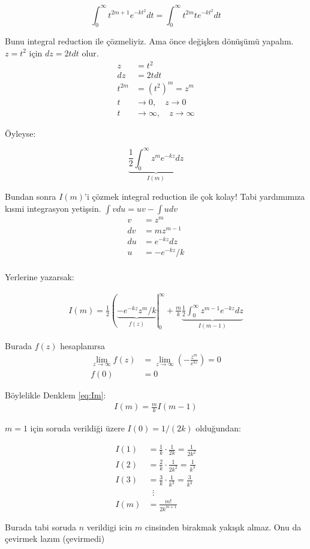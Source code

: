 \documentclass{article}
\begin{document}
\begin{equation}
    \int_0^\infty t^{2m+1}e^{-kt^2}dt = \int_0^\infty t^{2m}te^{-kt^2}dt
\end{equation}

Bunu integral reduction ile çözmeliyiz. Ama önce değişken dönüşümü yapalım. $z = t^2$ için $dz = 2tdt$ olur.
\begin{align}
    z &= t^2 \\
    dz&= 2tdt \\
    t^{2m} &= (t^2)^m = z^m \\
    t &\rightarrow 0, \quad z \rightarrow 0 \\
    t &\rightarrow \infty, \quad  z \rightarrow \infty
\end{align}

Öyleyse:

\begin{equation}
     \underbrace{\frac{1}{2} \int_0^\infty z^m e^{-kz}dz}_{I(m)}
\end{equation}

Bundan sonra $I(m)$'i çözmek integral reduction ile çok kolay! Tabi yardımımıza kısmi integrasyon yetişsin. $\int vdu = uv - \int udv$
\begin{align}
    v &= z^m \\
    dv&= mz^{m-1} \\
    du&= e^{-kz}dz \\
    u &= -e^{-kz}/k \\
\end{align}

Yerlerine yazarsak:

\begin{align}
    \label{eq:Im}
    I(m) = \frac{1}{2}\left(\underbrace{-e^{-kz}z^m/k}_{f(z)}\right|_0^\infty + \frac{m}{k}\underbrace{\frac{1}{2}\int_0^\infty z^{m-1}e^{-kz}dz}_{I(m-1)} 
\end{align}

Burada $f(z)$ hesaplanırsa 
\begin{align}
\lim_{z \to \infty} f(z) &= \lim_{z \to \infty} \left(-\frac{z^m}{e^{kz}}\right) = 0 \\
f(0) &= 0 
\end{align}


Böylelikle Denklem \eqref{eq:Im}: 
\begin{align}
    I(m) = \frac{m}{k} I(m-1) 
\end{align}

$m=1$ için soruda verildiği üzere $I(0) = 1/(2k)$ olduğundan: 

\begin{align}
    I(1) &= \frac{1}{k} \cdot \frac{1}{2k} = \frac{1}{2k^2} \\
    I(2) &= \frac{2}{k} \cdot \frac{1}{2k^2} = \frac{1}{k^3} \\
    I(3) &= \frac{3}{k} \cdot \frac{1}{k^3} = \frac{3}{k^4} \\
      & \;\;\vdots \\
    I(m) &= \frac{m!}{2k^{m+1}} 
\end{align}

Burada tabi soruda $n$ verildigi icin $m$ cinsinden birakmak yakışık almaz. Onu da çevirmek lazım (çevirmedi)
\end{document}
